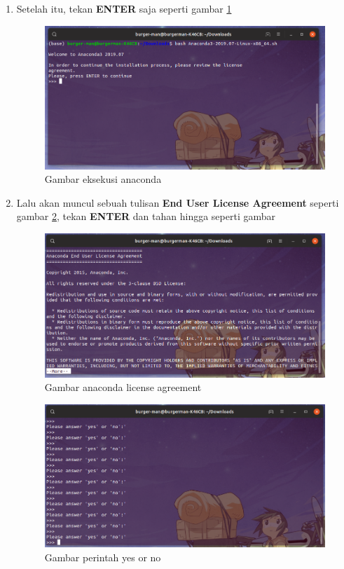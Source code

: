 \begin{enumerate}
\item Setelah itu, tekan \textbf{ENTER} saja seperti gambar \ref{anacondaenter}
\begin{figure}[H]
\centering
\includegraphics[width=1\textwidth]{figures/ubuntu/anacondaenter.png}
\caption{Gambar eksekusi anaconda}
\label{anacondaenter}
\end{figure}

\item Lalu akan muncul sebuah tulisan \textbf{End User License Agreement} seperti gambar \ref{entertrus}, tekan \textbf{ENTER} dan tahan hingga seperti gambar 
\begin{figure}[H]
\centering
\includegraphics[width=1\textwidth]{figures/ubuntu/entertrus.png}
\caption{Gambar anaconda license agreement}
\label{entertrus}
\end{figure}
\begin{figure}[H]
\centering
\includegraphics[width=1\textwidth]{figures/ubuntu/enterkekgini.png}
\caption{Gambar perintah yes or no}
\label{enterkekgini}
\end{figure}


\end{enumerate}
